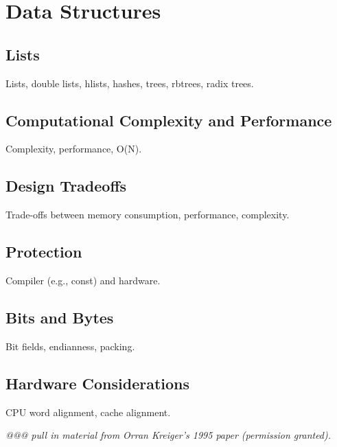 
\chapter{Data Structures}
\label{chp:Data Structures}

\section{Lists}
\label{sec:datastruct:Lists}

Lists, double lists, hlists, hashes, trees, rbtrees, radix trees.

\section{Computational Complexity and Performance}
\label{sec:datastruct:Computational Complexity and Performance}

Complexity, performance, O(N).

\section{Design Tradeoffs}
\label{sec:datastruct:Design Tradeoffs}

Trade-offs between memory consumption, performance, complexity.

\section{Protection}
\label{sec:datastruct:Protection}

Compiler (e.g., const) and hardware.

\section{Bits and Bytes}
\label{sec:datastruct:Bits and Bytes}

Bit fields, endianness, packing.

\section{Hardware Considerations}
\label{sec:datastruct:Hardware Considerations}

CPU word alignment, cache alignment.

\emph{@@@ pull in material from Orran Kreiger's 1995 paper (permission
granted).}
